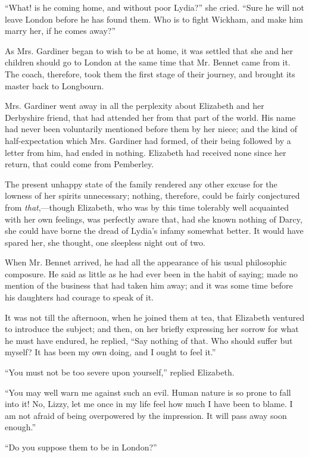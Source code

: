 \documentclass[12pt]{book}
\begin{document}
``What! is he coming home, and without poor Lydia?'' she cried. ``Sure he will not leave London before he has found them. Who is to fight Wickham, and make him marry her, if he comes away?''

As Mrs. Gardiner began to wish to be at home, it was settled that she and her children should go to London at the same time that Mr. Bennet came from it. The coach, therefore, took them the first stage of their journey, and brought its master back to Longbourn.

Mrs. Gardiner went away in all the perplexity about Elizabeth and her Derbyshire friend, that had attended her from that part of the world. His name had never been voluntarily mentioned before them by her niece; and the kind of half-expectation which Mrs. Gardiner had formed, of their being followed by a letter from him, had ended in nothing. Elizabeth had received none since her return, that could come from Pemberley.

The present unhappy state of the family rendered any other excuse for the lowness of her spirits unnecessary; nothing, therefore, could be fairly conjectured from \textit{that},---though Elizabeth, who was by this time tolerably well acquainted with her own feelings, was perfectly aware that, had she known nothing of Darcy, she could have borne the dread of Lydia's infamy somewhat better. It would have spared her, she thought, one sleepless night out of two.

When Mr. Bennet arrived, he had all the appearance of his usual philosophic composure. He said as little as he had ever been in the habit of saying; made no mention of the business that had taken him away; and it was some time before his daughters had courage to speak of it.

It was not till the afternoon, when he joined them at tea, that Elizabeth ventured to introduce the subject; and then, on her briefly expressing her sorrow for what he must have endured, he replied, ``Say nothing of that. Who should suffer but myself? It has been my own doing, and I ought to feel it.''

``You must not be too severe upon yourself,'' replied Elizabeth.

``You may well warn me against such an evil. Human nature is so prone to fall into it! No, Lizzy, let me once in my life feel how much I have been to blame. I am not afraid of being overpowered by the impression. It will pass away soon enough.''

``Do you suppose them to be in London?''
\end{document}
